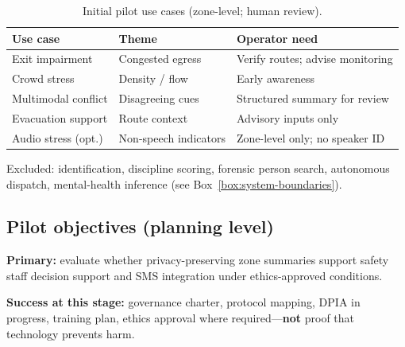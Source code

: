 \begin{table}[htbp]
  \centering
  \caption{Initial pilot use cases (zone-level; human review).}
  \label{tab:use-cases}
  \small
  \begin{tabular}{@{}p{2.6cm}p{3.4cm}p{4.0cm}@{}}
    \toprule
    Use case & Theme & Operator need \\
    \midrule
    Exit impairment & Congested egress & Verify routes; advise monitoring \\
    Crowd stress & Density / flow & Early awareness \\
    Multimodal conflict & Disagreeing cues & Structured summary for review \\
    Evacuation support & Route context & Advisory inputs only \\
    Audio stress (opt.) & Non-speech indicators & Zone-level only; no speaker ID \\
    \bottomrule
  \end{tabular}
\end{table}

Excluded: identification, discipline scoring, forensic person search, autonomous dispatch,
mental-health inference (see Box~\ref{box:system-boundaries}).

\subsection{Pilot objectives (planning level)}

\textbf{Primary:} evaluate whether privacy-preserving zone summaries support safety staff
decision support and SMS integration under ethics-approved conditions.

\textbf{Success at this stage:} governance charter, protocol mapping, DPIA in progress, training
plan, ethics approval where required---\textbf{not} proof that technology prevents harm.
